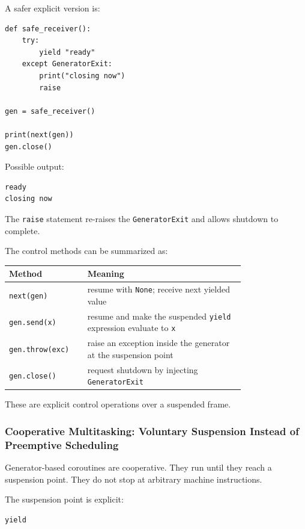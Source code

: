 A safer explicit version is:

\begin{verbatim}
def safe_receiver():
    try:
        yield "ready"
    except GeneratorExit:
        print("closing now")
        raise

gen = safe_receiver()

print(next(gen))
gen.close()
\end{verbatim}

Possible output:

\begin{verbatim}
ready
closing now
\end{verbatim}

The \texttt{raise} statement re-raises the \texttt{GeneratorExit} and allows shutdown to complete.

The control methods can be summarized as:

\begin{center}
\begin{tabular}{|p{0.22\linewidth}|p{0.56\linewidth}|}
\hline
\textbf{Method} & \textbf{Meaning} \\
\hline
\texttt{next(gen)} & resume with \texttt{None}; receive next yielded value \\
\hline
\texttt{gen.send(x)} & resume and make the suspended \texttt{yield} expression evaluate to \texttt{x} \\
\hline
\texttt{gen.throw(exc)} & raise an exception inside the generator at the suspension point \\
\hline
\texttt{gen.close()} & request shutdown by injecting \texttt{GeneratorExit} \\
\hline
\end{tabular}
\end{center}

These are explicit control operations over a suspended frame.

\subsubsection{Cooperative Multitasking: Voluntary Suspension Instead of Preemptive Scheduling}

Generator-based coroutines are cooperative. They run until they reach a suspension point. They do not stop at arbitrary machine instructions.

The suspension point is explicit:

\begin{verbatim}
yield
\end{verbatim}

